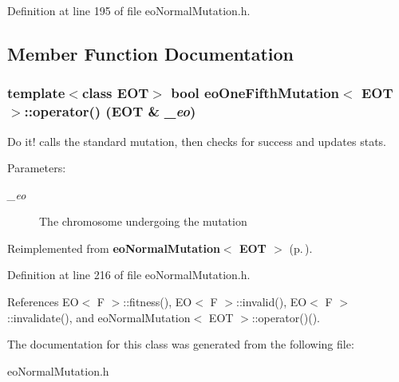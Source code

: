 Definition at line 195 of file eo\-Normal\-Mutation.h.

\subsection{Member Function Documentation}
\subsubsection{\setlength{\rightskip}{0pt plus 5cm}template$<$class EOT$>$ bool {\bf eo\-One\-Fifth\-Mutation}$<$ {\bf EOT} $>$::operator() ({\bf EOT} \& {\em \_\-eo})\hspace{0.3cm}{\tt  [inline, virtual]}}\label{classeo_one_fifth_mutation_a2}


Do it! calls the standard mutation, then checks for success and updates stats. 

\begin{Desc}
\item[Parameters:]
\begin{description}
\item[{\em \_\-eo}]The chromosome undergoing the mutation \end{description}
\end{Desc}


Reimplemented from {\bf eo\-Normal\-Mutation$<$ EOT $>$} {\rm (p.\,\pageref{classeo_normal_mutation_a3})}.

Definition at line 216 of file eo\-Normal\-Mutation.h.

References EO$<$ F $>$::fitness(), EO$<$ F $>$::invalid(), EO$<$ F $>$::invalidate(), and eo\-Normal\-Mutation$<$ EOT $>$::operator()().

The documentation for this class was generated from the following file:\begin{CompactItemize}
\item 
eo\-Normal\-Mutation.h\end{CompactItemize}
